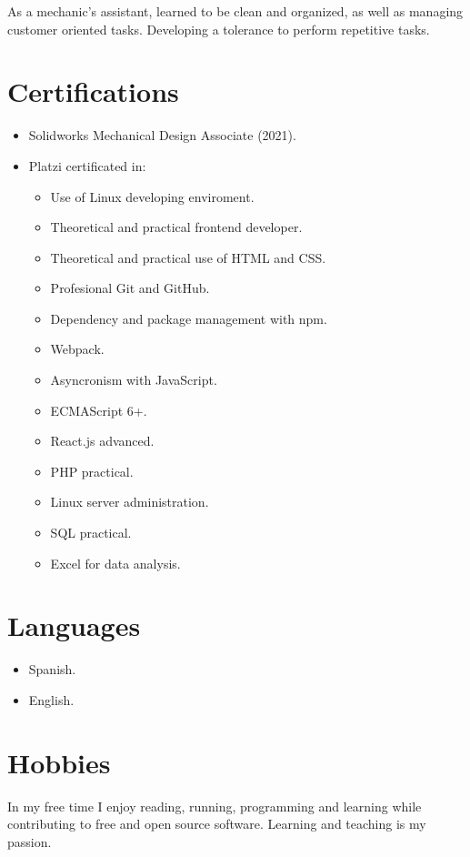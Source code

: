\documentclass{article}
\begin{document}
  As a mechanic's assistant, learned to be clean and organized, as well as managing customer oriented tasks. Developing a tolerance to perform repetitive tasks.%


  \section{Certifications}%

  \begin{itemize}
    \item Solidworks Mechanical Design Associate (2021).
    \item Platzi certificated in:

      \begin{multicols}{2}
      \begin{itemize}
        \item Use of Linux developing enviroment.
        \item Theoretical and practical frontend developer.
        \item Theoretical and practical use of HTML and CSS\@.
        \item Profesional Git and GitHub.
        \item Dependency and package management with npm.
        \item Webpack.
        \item Asyncronism with JavaScript.
        \item ECMAScript 6+.
        \item React.js advanced.
        \item PHP practical.
        \item Linux server administration.
        \item SQL practical.
        \item Excel for data analysis.
      \end{itemize}
      \end{multicols}
  \end{itemize}%


  \section{Languages}%

  \begin{itemize}
    \item Spanish.
    \item English.
  \end{itemize}%


  \section{Hobbies}%

  In my free time I enjoy reading, running, programming and learning while contributing to free and open source software. Learning and teaching is my passion.%
\end{document}
